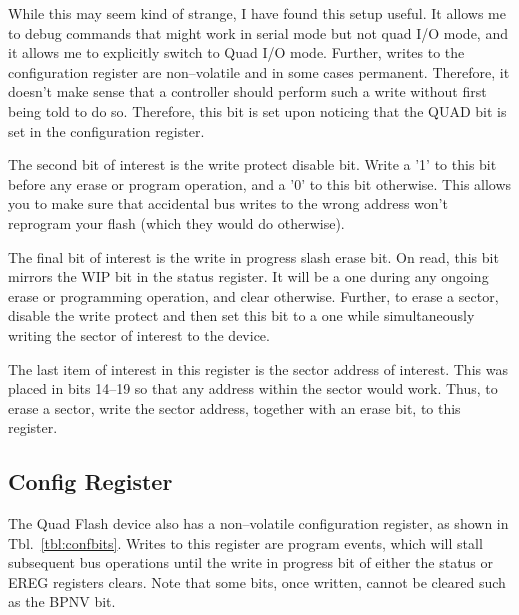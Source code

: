 \documentclass{gqtekspec}
\begin{document}
While this may seem kind of strange, I have found this setup useful.  It allows
me to debug commands that might work in serial mode but not quad I/O mode,
and it allows me to explicitly switch to Quad I/O mode.  Further, writes to the
configuration register are non--volatile and in some cases permanent. 
Therefore, it doesn't make sense that a controller should perform such a write
without first being told to do so.  Therefore, this bit is set upon
noticing that the QUAD bit is set in the configuration register.

The second bit of interest is the write protect disable bit.  Write a '1'
to this bit before any erase or program operation, and a '0' to this bit
otherwise.  This allows you to make sure that accidental bus writes to the
wrong address won't reprogram your flash (which they would do otherwise).

The final bit of interest is the write in progress slash erase bit.  On read,
this bit mirrors the WIP bit in the status register.  It will be a one during
any ongoing erase or programming operation, and clear otherwise.  Further,
to erase a sector, disable the write protect and then set this bit to a one
while simultaneously writing the sector of interest to the device.

The last item of interest in this register is the sector address of interest.
This was placed in bits 14--19 so that any address within the sector
would work.  Thus, to erase a sector, write the sector address, together with
an erase bit, to this register.

\subsection{Config Register}

The Quad Flash device also has a non--volatile configuration register, as
shown in Tbl.~\ref{tbl:confbits}.  Writes to this register are program events, 
which will stall subsequent bus operations until the write in progress bit
of either the status or EREG registers clears.  Note that some bits, once
written, cannot be cleared such as the BPNV bit.
\end{document}
